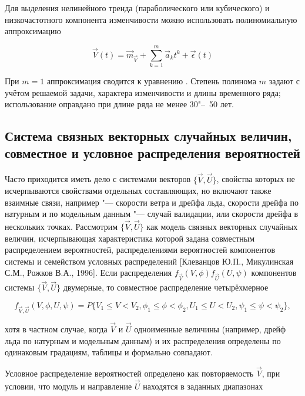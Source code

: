 
Для выделения нелинейного тренда (параболического или кубического) и низкочастотного компонента изменчивости можно использовать полиномиальную аппроксимацию

\begin{equation}
\label{eq:equation3_17}
{\vec{V}(t)=\vec{m}_{\vec{V}}+{\sum_{k=1}^m\vec{a}_{k}t^k+\vec{\epsilon}(t)}}
\end{equation} 

При $m=1$ аппроксимация  сводится к уравнению . Степень полинома $m$ задают с учётом решаемой задачи, характера изменчивости и длины временного ряда; использование  оправдано при длине ряда не менее 30"--~50 лет.

\subsection{Система связных векторных случайных величин, совместное и условное распределения вероятностей}
Часто приходится иметь дело с системами векторов $\{\vec{V},\vec{U}\}$, свойства которых не исчерпываются свойствами отдельных составляющих, но включают также взаимные связи, например "--- скорости ветра и дрейфа льда, скорости дрейфа по натурным и по модельным данным "--- случай валидации, или скорости дрейфа в нескольких точках. Рассмотрим $\{\vec{V},\vec{U}\}$ как модель связных векторных случайных величин, исчерпывающая характеристика которой задана совместным распределением вероятностей, распределениями вероятностей компонентов системы и семейством условных распределений [Клеванцов Ю.П., Микулинская С.М., Рожков В.А., 1996]. Если распределения $f_{\vec{V}}(V,\phi) f_{\vec{U}}(U,\psi)$  компонентов системы $\{\vec{V},\vec{U}\}$ двумерные, то совместное распределение четырёхмерное 
		
\begin{equation}
\label{eq:equation3_18}
{f_{\vec{V},\vec{U}}}(V,\phi,U,\psi)=P\{V_{1}\le{V}<{V_2}, \phi_1\le\phi<{\phi_2}, {U_1}\le{U}<{U_2}, \psi_1\le{\psi}<{\psi_2}\},
\end{equation} 

хотя в частном случае, когда $\vec{V}$ и $\vec{U}$ одноименные величины (например, дрейф льда по натурным и модельным данным) и их распределения определены по одинаковым градациям, таблицы  и  формально совпадают.

Условное распределение вероятностей определено как повторяемость $\vec{V}$, при условии, что модуль и направление $\vec{U}$ находятся в заданных диапазонах

